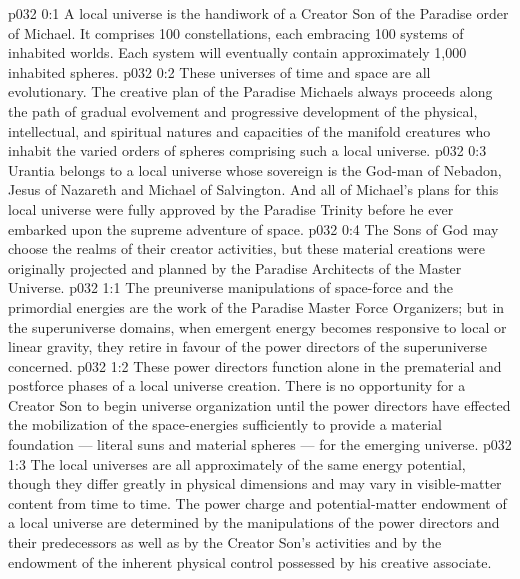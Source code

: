 \author{Mighty Messenger}
\vs p032 0:1 A local universe is the handiwork of a Creator Son of the Paradise order of Michael. It comprises 100 constellations, each embracing 100 systems of inhabited worlds. Each system will eventually contain approximately 1,000 inhabited spheres.
\vs p032 0:2 These universes of time and space are all evolutionary. The creative plan of the Paradise Michaels always proceeds along the path of gradual evolvement and progressive development of the physical, intellectual, and spiritual natures and capacities of the manifold creatures who inhabit the varied orders of spheres comprising such a local universe.
\vs p032 0:3 Urantia belongs to a local universe whose sovereign is the God\hyp{}man of Nebadon, Jesus of Nazareth and Michael of Salvington. And all of Michael’s plans for this local universe were fully approved by the Paradise Trinity before he ever embarked upon the supreme adventure of space.
\vs p032 0:4 The Sons of God may choose the realms of their creator activities, but these material creations were originally projected and planned by the Paradise Architects of the Master Universe.
\vs p032 1:1 The preuniverse manipulations of space\hyp{}force and the primordial energies are the work of the Paradise Master Force Organizers; but in the superuniverse domains, when emergent energy becomes responsive to local or linear gravity, they retire in favour of the power directors of the superuniverse concerned.
\vs p032 1:2 These power directors function alone in the prematerial and postforce phases of a local universe creation. There is no opportunity for a Creator Son to begin universe organization until the power directors have effected the mobilization of the space\hyp{}energies sufficiently to provide a material foundation --- literal suns and material spheres --- for the emerging universe.
\vs p032 1:3 \pc The local universes are all approximately of the same energy potential, though they differ greatly in physical dimensions and may vary in visible\hyp{}matter content from time to time. The power charge and potential\hyp{}matter endowment of a local universe are determined by the manipulations of the power directors and their predecessors as well as by the Creator Son’s activities and by the endowment of the inherent physical control possessed by his creative associate.
